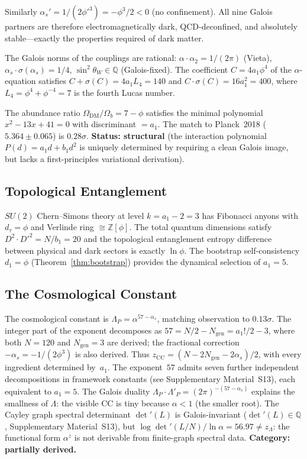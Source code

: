 \documentclass[12pt,a4paper]{article}
\theoremstyle{definition}
\begin{document}
Similarly $\alpha_s' = 1/(2\phi'^3) = -\phi^3/2 < 0$ (no confinement).  All nine Galois partners are therefore electromagnetically dark, QCD-deconfined, and absolutely stable---exactly the properties required of dark matter.

The Galois norms of the couplings are rational: $\alpha \cdot \alpha_2 = 1/(2\pi)$ (Vieta), $\alpha_s \cdot \sigma(\alpha_s) = 1/4$, $\sin^2\theta_W \in \mathbb{Q}$ (Galois-fixed).  The coefficient $C = 4a_1\phi^4$ of the $\alpha$-equation satisfies $C + \sigma(C) = 4a_1 L_4 = 140$ and $C \cdot \sigma(C) = 16a_1^2 = 400$, where $L_4 = \phi^4 + \phi^{-4} = 7$ is the fourth Lucas number.

The abundance ratio $\Omega_{\text{DM}}/\Omega_b = 7 - \phi$ satisfies the minimal polynomial $x^2 - 13x + 41 = 0$ with discriminant $= a_1$.  The match to Planck~2018 ($5.364 \pm 0.065$) is $0.28\sigma$.  \textbf{Status: structural} (the interaction polynomial $P(d) = a_1 d + b_1 d^2$ is uniquely determined by requiring a clean Galois image, but lacks a first-principles variational derivation).

\subsection{Topological Entanglement}
\label{sec:tqft}

$SU(2)$ Chern--Simons theory at level $k = a_1 - 2 = 3$ has Fibonacci anyons with $d_\tau = \phi$ and Verlinde ring $\cong \mathbb{Z}[\phi]$.  The total quantum dimensions satisfy $D^2 \cdot D'^2 = N/b_1 = 20$ and the topological entanglement entropy difference between physical and dark sectors is exactly $\ln\phi$.  The bootstrap self-consistency $d_1 = \phi$ (Theorem~\ref{thm:bootstrap}) provides the dynamical selection of $a_1 = 5$.

\subsection{The Cosmological Constant}
\label{sec:cc}

The cosmological constant is $\Lambda_P = \alpha^{57-\alpha_s}$, matching observation to $0.13\sigma$.  The integer part of the exponent decomposes as $57 = N/2 - N_{\mathrm{gen}} = a_1!/2 - 3$, where both $N = 120$ and $N_{\mathrm{gen}} = 3$ are derived; the fractional correction $-\alpha_s = -1/(2\phi^3)$ is also derived.  Thus $z_{\mathrm{CC}} = (N - 2N_{\mathrm{gen}} - 2\alpha_s)/2$, with every ingredient determined by~$a_1$.  The exponent~$57$ admits seven further independent decompositions in framework constants (see Supplementary Material~S13), each equivalent to $a_1 = 5$.  The Galois duality $\Lambda_P \cdot \Lambda'_P = (2\pi)^{-(57-\alpha_s)}$ explains the smallness of $\Lambda$: the visible CC is tiny because $\alpha < 1$ (the smaller root).  The Cayley graph spectral determinant $\det'(L)$ is Galois-invariant ($\det'(L) \in \mathbb{Q}$, Supplementary Material~S13), but $\log\det'(L/N)/\ln\alpha = 56.97 \neq z_\Lambda$: the functional form $\alpha^z$ is not derivable from finite-graph spectral data.  \textbf{Category: partially derived.}
\end{document}
